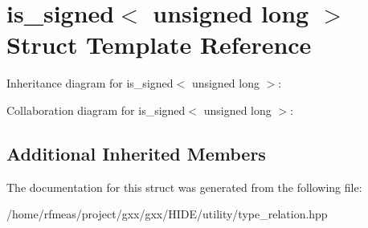 \hypertarget{structis__signed_3_01unsigned_01long_01_4}{}\section{is\+\_\+signed$<$ unsigned long $>$ Struct Template Reference}
\label{structis__signed_3_01unsigned_01long_01_4}


Inheritance diagram for is\+\_\+signed$<$ unsigned long $>$\+:


Collaboration diagram for is\+\_\+signed$<$ unsigned long $>$\+:
\subsection*{Additional Inherited Members}


The documentation for this struct was generated from the following file\+:\begin{DoxyCompactItemize}
\item 
/home/rfmeas/project/gxx/gxx/\+H\+I\+D\+E/utility/type\+\_\+relation.\+hpp\end{DoxyCompactItemize}
